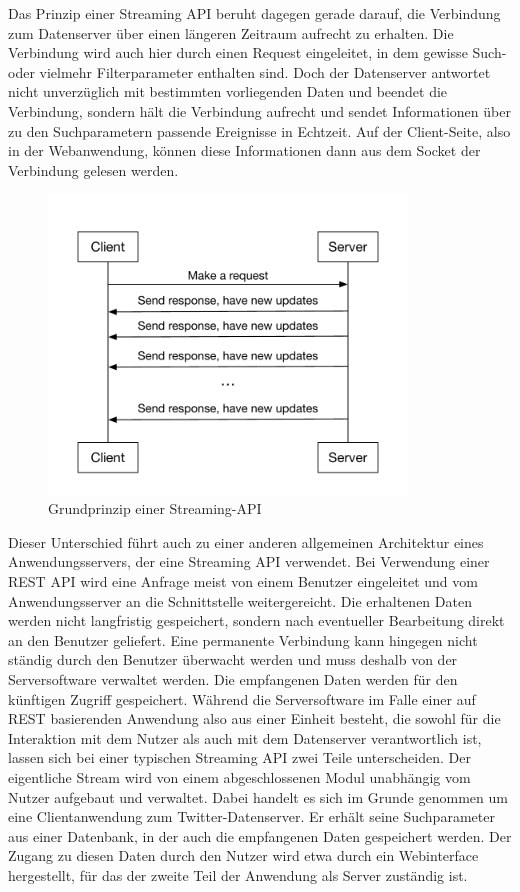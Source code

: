 %
Das Prinzip einer Streaming API beruht dagegen gerade darauf, die Verbindung zum Datenserver über einen längeren Zeitraum aufrecht zu erhalten. Die Verbindung wird auch hier durch einen Request eingeleitet, in dem gewisse Such- oder vielmehr Filterparameter enthalten sind. Doch der Datenserver antwortet nicht unverzüglich mit bestimmten vorliegenden Daten und beendet die Verbindung, sondern hält die Verbindung aufrecht und sendet Informationen über zu den Suchparametern passende Ereignisse in Echtzeit. Auf der Client-Seite, also in der Webanwendung, können diese Informationen dann aus dem Socket der Verbindung gelesen werden.
%
\begin{figure}[!h]
    \centering
    \includegraphics[width=0.85\textwidth]{Graphics/streaming_api}
    \caption[Grundprinzip einer Streaming-API, in Anlehnung an \cite{quora:api}]{Grundprinzip einer Streaming-API \cite{quora:api}}
   \label{fig:streamapi}
\end{figure}
%
Dieser Unterschied führt auch zu einer anderen allgemeinen Architektur eines Anwendungsservers, der eine Streaming API verwendet. Bei Verwendung einer \acs{REST} API wird eine Anfrage meist von einem Benutzer eingeleitet und vom Anwendungsserver an die Schnittstelle weitergereicht. Die erhaltenen Daten werden nicht langfristig gespeichert, sondern nach eventueller Bearbeitung direkt an den Benutzer geliefert. Eine permanente Verbindung kann hingegen nicht ständig durch den Benutzer überwacht werden und muss deshalb von der Serversoftware verwaltet werden. Die empfangenen Daten werden für den künftigen Zugriff gespeichert. Während die Serversoftware im Falle einer auf REST basierenden Anwendung also aus einer Einheit besteht, die sowohl für die Interaktion mit dem Nutzer als auch mit dem Datenserver verantwortlich ist, lassen sich bei einer typischen Streaming API zwei Teile unterscheiden. Der eigentliche Stream wird von einem abgeschlossenen Modul unabhängig vom Nutzer aufgebaut und verwaltet. Dabei handelt es sich im Grunde genommen um eine Clientanwendung zum Twitter-Datenserver. Er erhält seine Suchparameter aus einer Datenbank, in der auch die empfangenen Daten gespeichert werden. Der Zugang zu diesen Daten durch den Nutzer wird etwa durch ein Webinterface hergestellt, für das der zweite Teil der Anwendung als Server zuständig ist.
